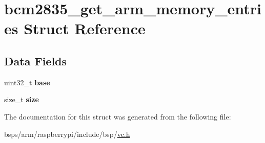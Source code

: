 \hypertarget{structbcm2835__get__arm__memory__entries}{}\section{bcm2835\+\_\+get\+\_\+arm\+\_\+memory\+\_\+entries Struct Reference}
\label{structbcm2835__get__arm__memory__entries}
\subsection*{Data Fields}
\begin{DoxyCompactItemize}
\item 
\mbox{\label{structbcm2835__get__arm__memory__entries_a853cb390ea0ec953fa9e4c7999f2a41b}} 
uint32\+\_\+t {\bfseries base}
\item 
\mbox{\label{structbcm2835__get__arm__memory__entries_abcf5509731c954b554b84c440e9ce63e}} 
size\+\_\+t {\bfseries size}
\end{DoxyCompactItemize}


The documentation for this struct was generated from the following file\+:\begin{DoxyCompactItemize}
\item 
bsps/arm/raspberrypi/include/bsp/\mbox{\hyperlink{vc_8h}{vc.\+h}}\end{DoxyCompactItemize}
